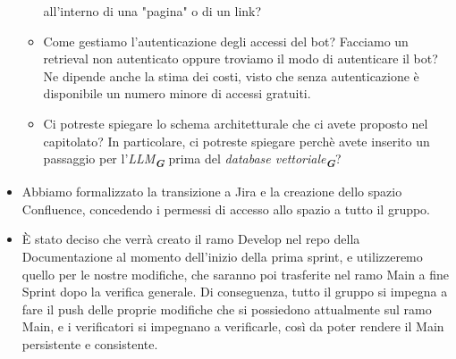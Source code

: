 \begin{itemize}
\begin{itemize}
        all'interno di una "pagina" o di un link?
        \item Come gestiamo l'autenticazione degli accessi del bot? Facciamo un retrieval non autenticato oppure troviamo il modo di autenticare il bot?
        Ne dipende anche la stima dei costi, visto che senza autenticazione è disponibile un numero minore di accessi gratuiti.
        \item Ci potreste spiegare lo schema architetturale che ci avete proposto nel capitolato? In particolare, ci potreste spiegare perchè avete 
        inserito un passaggio per l'\emph{LLM}\textsubscript{\textit{\textbf{G}}} prima del \emph{database vettoriale}\textsubscript{\textit{\textbf{G}}}?
    \end{itemize}
    \item Abbiamo formalizzato la transizione a Jira e la creazione dello spazio Confluence, 
    concedendo i permessi di accesso allo spazio a tutto il gruppo.
    \item È stato deciso che verrà creato il ramo Develop nel repo della Documentazione al momento dell'inizio della prima sprint, e utilizzeremo
    quello per le nostre modifiche, che saranno poi trasferite nel ramo Main a fine Sprint dopo la verifica generale. Di conseguenza, tutto il gruppo
    si impegna a fare il push delle proprie modifiche che si possiedono attualmente sul ramo Main, e i verificatori si impegnano a verificarle, 
    così da poter rendere il Main persistente e consistente.
\end{itemize}
